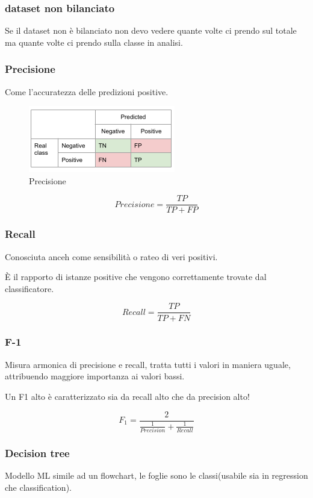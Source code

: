 \subsubsection{dataset non bilanciato}
Se il dataset non è bilanciato non devo vedere quante volte ci prendo sul totale
ma quante volte ci prendo sulla classe in analisi.

\subsubsection{Precisione}
Come l'accuratezza delle predizioni positive.

\begin{figure}[H]
    \centering
    \includegraphics[width=0.2\linewidth]{imgs/precisione}
    \caption{Precisione}
    \label{fig:precisione}
\end{figure}


\begin{equation}
    Precisione = \frac{TP}{TP+FP}
\end{equation}


\subsubsection{Recall}
Conosciuta anceh come sensibilità o rateo di veri positivi.

È il rapporto di istanze positive che vengono correttamente trovate
dal classificatore.

\begin{equation}
    Recall = \frac{TP}{TP+FN}
\end{equation}

\subsubsection{F-1}
Misura armonica di precisione e recall,
tratta tutti i valori in maniera uguale,
attribuendo maggiore importanza ai valori bassi.

Un F1 alto è caratterizzato sia da recall alto che da precision alto!


\begin{equation}
    F_1 = \frac{2}
    {\frac{1}{Precision} +
    \frac{1}{Recall}}
\end{equation}


\subsubsection{Decision tree}
Modello ML simile ad un flowchart, le foglie sono le
classi(usabile sia in regression che classification).

